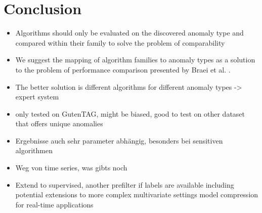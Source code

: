 \chapter{Conclusion}
\begin{itemize}
    \item Algorithms should only be evaluated on the discovered anomaly type and compared within their family to solve the problem of comparability
    \item We suggest the mapping of algorithm families to anomaly types as a solution to the problem of performance comparison presented by Braei et al. \cite{Braei2020}.
    \item The better solution is different algorithms for different anomaly types -> expert system
    \item only tested on GutenTAG, might be biased, good to test on other dataset that offers unique anomalies
    \item Ergebnisse auch sehr parameter abhängig, besonders bei sensitiven algorithmen
    \item Weg von time series, was gibts noch
    \item Extend to supervised, another prefilter if labels are available
    including potential extensions to more complex multivariate settings
    model compression for real-time applications
\end{itemize}
